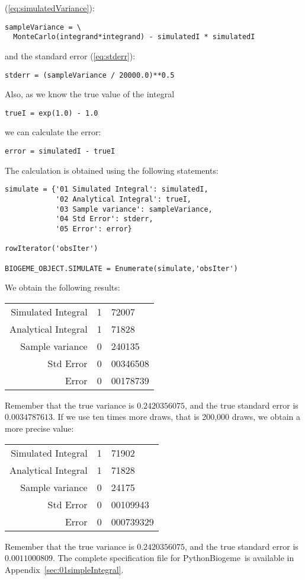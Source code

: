 \documentclass[12pt,a4paper]{article}
\newcommand{\req}[1]{(\ref{#1})}
\newcommand{\PBIOGEME}{PythonBiogeme}
\begin{document}
\req{eq:simulatedVariance}:
\begin{lstlisting}
sampleVariance = \
  MonteCarlo(integrand*integrand) - simulatedI * simulatedI
\end{lstlisting}
and the standard error \req{eq:stderr}:
\begin{lstlisting}
stderr = (sampleVariance / 20000.0)**0.5
\end{lstlisting}
Also, as we know the true value of the integral
\begin{lstlisting}
trueI = exp(1.0) - 1.0 
\end{lstlisting}
we can calculate the error:
\begin{lstlisting}
error = simulatedI - trueI
\end{lstlisting}
The calculation is obtained using the following statements:
\begin{lstlisting}
simulate = {'01 Simulated Integral': simulatedI,
            '02 Analytical Integral': trueI,
            '03 Sample variance': sampleVariance,
            '04 Std Error': stderr,
            '05 Error': error}

rowIterator('obsIter') 

BIOGEME_OBJECT.SIMULATE = Enumerate(simulate,'obsIter')
\end{lstlisting}
We obtain the following results:
\begin{center}
\begin{tabular}{rr@{.}l}
Simulated Integral & 1&72007 \\
Analytical Integral & 1&71828 \\
Sample variance & 0&240135 \\
Std Error & 0&00346508 \\
Error &0&00178739 \\
\end{tabular}
\end{center}
Remember that the true variance is $0.2420356075$, and the true standard
error is $0.0034787613$.
If we use ten times more draws, that is 200,000 draws, we obtain a
more precise value:
\begin{center}
\begin{tabular}{rr@{.}l}
Simulated Integral & 1&71902 \\
Analytical Integral & 1&71828 \\
Sample variance & 0&24175 \\
Std Error & 0&00109943 \\
Error &0&000739329
\end{tabular}
\end{center}
Remember that the true variance is $0.2420356075$, and the true standard
error is $0.0011000809$.
The complete specification file for \PBIOGEME\ is available in Appendix~\ref{sec:01simpleIntegral}.
\end{document}
